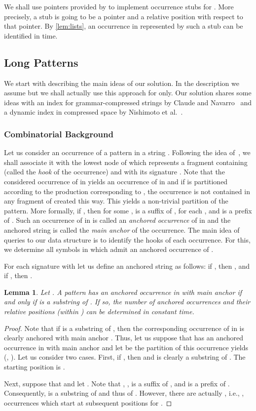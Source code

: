 \documentclass[a4paper]{article}
\newtheorem{lemma}[theorem]{Lemma}
\theoremstyle{remark}
\begin{document}
We shall use pointers provided by  to implement occurrence stubs for .
More precisely, a stub is going to be a pointer and a relative position with respect to that pointer.
By \cref{lem:lists}, an occurrence in  represented by such a stub can be identified in  time.

\subsection{Long Patterns}\label{sec:long}

We start with describing the main ideas of our solution. In the description we assume  but we shall actually
use this approach for  only.
Our solution shares some ideas with an index for grammar-compressed strings by Claude and Navarro~\cite{DBLP:journals/fuin/ClaudeN11}
and a dynamic index in compressed space by Nishimoto et al.~\cite{DBLP:journals/corr/NishimotoIIBT15}.

\subsubsection{Combinatorial Background}
Let us consider an occurrence  of a pattern  in a string .
Following the idea of~\cite{DBLP:journals/fuin/ClaudeN11}, we shall associate it with the lowest node  of  which represents a fragment
containing  (called the \emph{hook} of the occurrence) and with its signature .
Note that the considered occurrence of  in  yields an occurrence of  in 
and if  is partitioned according to the production corresponding to , the occurrence
is not contained in any fragment of  created this way.
This yields a non-trivial partition  of the pattern.
More formally, if , then for some
,  is a suffix of ,
for each , 
and  is a prefix of .
Such an occurrence of  in  is called an \emph{anchored occurrence} of  in 
and the anchored string  is called the \emph{main anchor} of the occurrence.
The main idea of queries to our data structure is to identify the hooks of each occurrence.
For this, we determine all symbols  in  which admit an anchored occurrence of .

For each signature  with  let us define an anchored string  as follows:
if , then , and if , then .
\begin{lemma}\label{lem:relanch}
  Let .
A pattern  has an anchored occurrence in  with main anchor 
if and only if  is a substring of . If so, the number of anchored occurrences and their relative positions (within )
can be determined in constant time.
\end{lemma}
\begin{proof}
Note that if  is a substring of , then the corresponding occurrence of  in  is clearly anchored
with main anchor .
Thus, let us suppose that  has an anchored occurrence in  with main anchor  and let  be the partition of  this occurrence yields (, ).
Let us consider two cases.
First, if , then  and  is clearly a substring of .
The starting position is .

Next, suppose that  and let . Note that , ,  is a suffix of , and  is a prefix of . Consequently,  is a substring of  and thus of .
However, there are actually , i.e., ,
occurrences which start at subsequent positions  for .
\end{proof}
\end{document}
